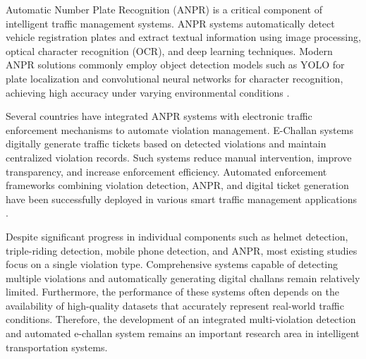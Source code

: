 Automatic Number Plate Recognition (ANPR) is a critical component of intelligent traffic management systems. ANPR systems automatically detect vehicle registration plates and extract textual information using image processing, optical character recognition (OCR), and deep learning techniques. Modern ANPR solutions commonly employ object detection models such as YOLO for plate localization and convolutional neural networks for character recognition, achieving high accuracy under varying environmental conditions \cite{Du2013}.

Several countries have integrated ANPR systems with electronic traffic enforcement mechanisms to automate violation management. E-Challan systems digitally generate traffic tickets based on detected violations and maintain centralized violation records. Such systems reduce manual intervention, improve transparency, and increase enforcement efficiency. Automated enforcement frameworks combining violation detection, ANPR, and digital ticket generation have been successfully deployed in various smart traffic management applications \cite{Sharma2023}.

Despite significant progress in individual components such as helmet detection, triple-riding detection, mobile phone detection, and ANPR, most existing studies focus on a single violation type. Comprehensive systems capable of detecting multiple violations and automatically generating digital challans remain relatively limited. Furthermore, the performance of these systems often depends on the availability of high-quality datasets that accurately represent real-world traffic conditions. Therefore, the development of an integrated multi-violation detection and automated e-challan system remains an important research area in intelligent transportation systems.
